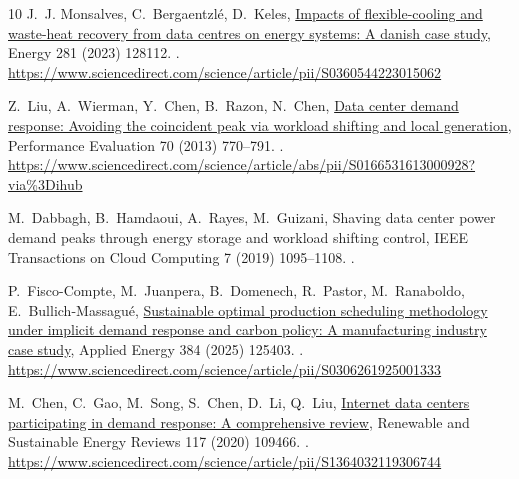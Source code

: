 \documentclass[preprint,12pt]{elsarticle}
\begin{document}
\begin{thebibliography}{10}
J.~J. Monsalves, C.~Bergaentzlé, D.~Keles,
  \href{https://www.sciencedirect.com/science/article/pii/S0360544223015062}{Impacts
  of flexible-cooling and waste-heat recovery from data centres on energy
  systems: A danish case study}, Energy 281 (2023) 128112.
\newblock \href {https://doi.org/10.1016/J.ENERGY.2023.128112}
  {}.
\newline\urlprefix\url{https://www.sciencedirect.com/science/article/pii/S0360544223015062}

Z.~Liu, A.~Wierman, Y.~Chen, B.~Razon, N.~Chen,
  \href{https://www.sciencedirect.com/science/article/abs/pii/S0166531613000928?via%3Dihub}{Data
  center demand response: Avoiding the coincident peak via workload shifting
  and local generation}, Performance Evaluation 70 (2013) 770--791.
\newblock \href {https://doi.org/10.1016/J.PEVA.2013.08.014}
  {}.
\newline\urlprefix\url{https://www.sciencedirect.com/science/article/abs/pii/S0166531613000928?via%3Dihub}

M.~Dabbagh, B.~Hamdaoui, A.~Rayes, M.~Guizani, Shaving data center power demand
  peaks through energy storage and workload shifting control, IEEE Transactions
  on Cloud Computing 7 (2019) 1095--1108.
\newblock \href {https://doi.org/10.1109/TCC.2017.2744623}
  {}.

P.~Fisco-Compte, M.~Juanpera, B.~Domenech, R.~Pastor, M.~Ranaboldo,
  E.~Bullich-Massagué,
  \href{https://www.sciencedirect.com/science/article/pii/S0306261925001333}{Sustainable
  optimal production scheduling methodology under implicit demand response and
  carbon policy: A manufacturing industry case study}, Applied Energy 384
  (2025) 125403.
\newblock \href {https://doi.org/10.1016/J.APENERGY.2025.125403}
  {}.
\newline\urlprefix\url{https://www.sciencedirect.com/science/article/pii/S0306261925001333}

M.~Chen, C.~Gao, M.~Song, S.~Chen, D.~Li, Q.~Liu,
  \href{https://www.sciencedirect.com/science/article/pii/S1364032119306744}{Internet
  data centers participating in demand response: A comprehensive review},
  Renewable and Sustainable Energy Reviews 117 (2020) 109466.
\newblock \href {https://doi.org/https://doi.org/10.1016/j.rser.2019.109466}
  {}.
\newline\urlprefix\url{https://www.sciencedirect.com/science/article/pii/S1364032119306744}


\end{thebibliography}
\end{document}
